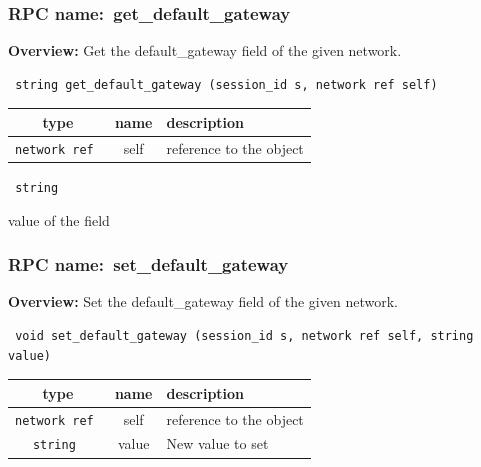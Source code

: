 \subsubsection{RPC name:~get\_default\_gateway}

{\bf Overview:} 
Get the default\_gateway field of the given network.

\begin{verbatim} string get_default_gateway (session_id s, network ref self)\end{verbatim}



 
\vspace{0.3cm}
\begin{tabular}{|c|c|p{7cm}|}
 \hline
{\bf type} & {\bf name} & {\bf description} \\ \hline
{\tt network ref } & self & reference to the object \\ \hline 

\end{tabular}

\vspace{0.3cm}

{\tt 
string
}


value of the field
\vspace{0.3cm}
\vspace{0.3cm}
\vspace{0.3cm}
\subsubsection{RPC name:~set\_default\_gateway}

{\bf Overview:} 
Set the default\_gateway field of the given network.

\begin{verbatim} void set_default_gateway (session_id s, network ref self, string value)\end{verbatim}



 
\vspace{0.3cm}
\begin{tabular}{|c|c|p{7cm}|}
 \hline
{\bf type} & {\bf name} & {\bf description} \\ \hline
{\tt network ref } & self & reference to the object \\ \hline 

{\tt string } & value & New value to set \\ \hline 

\end{tabular}

